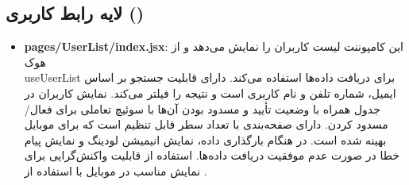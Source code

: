     \subsection{لایه رابط کاربری ()}
    \begin{itemize}
    	\item \textbf{pages/UserList/index.jsx}:
    	این کامپوننت لیست کاربران را نمایش می‌دهد و از هوک\\ useUserList برای دریافت داده‌ها استفاده می‌کند.
    	دارای قابلیت جستجو بر اساس ایمیل، شماره تلفن و نام کاربری است و نتیجه را فیلتر می‌کند.
    	نمایش کاربران در جدول همراه با وضعیت تأیید و مسدود بودن آن‌ها با سوئیچ تعاملی برای فعال/مسدود کردن.
    	دارای صفحه‌بندی با تعداد سطر قابل تنظیم است که برای موبایل بهینه شده است.
    	در هنگام بارگذاری داده، نمایش انیمیشن لودینگ و نمایش پیام خطا در صورت عدم موفقیت دریافت داده‌ها.
    	استفاده از قابلیت واکنش‌گرایی برای نمایش مناسب در موبایل با استفاده از .
    	
    	
    \end{itemize}
    